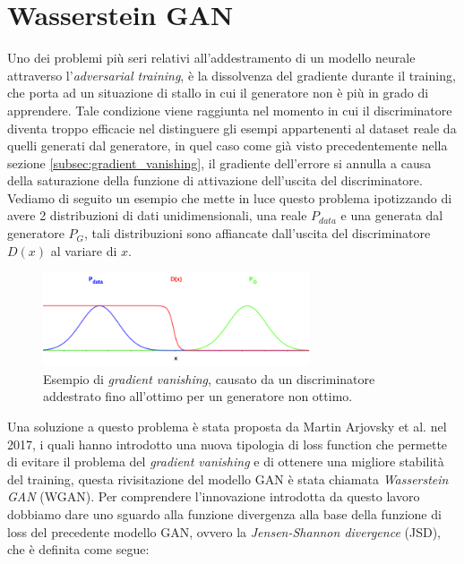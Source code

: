 \section{Wasserstein GAN}
Uno dei problemi più seri relativi all'addestramento di un modello neurale attraverso l'\textit{adversarial training},
è la dissolvenza del gradiente durante il training, che porta ad un situazione di stallo in cui il generatore non è più in grado di apprendere.
Tale condizione viene raggiunta nel momento in cui il discriminatore diventa troppo efficacie nel distinguere gli esempi appartenenti al dataset reale
da quelli generati dal generatore, in quel caso come già visto precedentemente nella sezione \ref{subsec:gradient_vanishing}, il gradiente dell'errore
si annulla a causa della saturazione della funzione di attivazione dell'uscita del discriminatore.
Vediamo di seguito un esempio che mette in luce questo problema ipotizzando di avere 2 distribuzioni di dati unidimensionali,
una reale $P_{data}$ e una generata dal generatore $P_{G}$, tali distribuzioni sono affiancate dall'uscita del discriminatore $D(x)$ al variare di $x$.

    \begin{figure}[H]
        \centering
        \includegraphics[width=0.7\textwidth]{imgs/wgan_grphs/wgan_graph_1.png}
        \caption{Esempio di \textit{gradient vanishing}, causato da un discriminatore
        addestrato fino all'ottimo per un generatore non ottimo.}
        \label{fig:WGAN_gradient_vanishing}
    \end{figure}

Una soluzione a questo problema è stata proposta da Martin Arjovsky et al. \cite{arjovsky2017wasserstein} nel 2017, i quali hanno introdotto una nuova tipologia
di loss function che permette di evitare il problema del \textit{gradient vanishing} e di ottenere una migliore stabilità del training,
questa rivisitazione del modello GAN è stata chiamata \textit{Wasserstein GAN} (WGAN).
Per comprendere l'innovazione introdotta da questo lavoro dobbiamo dare uno sguardo alla funzione divergenza alla base della funzione di loss del precedente
modello GAN, ovvero la \textit{Jensen-Shannon divergence} (JSD), che è definita come segue:

